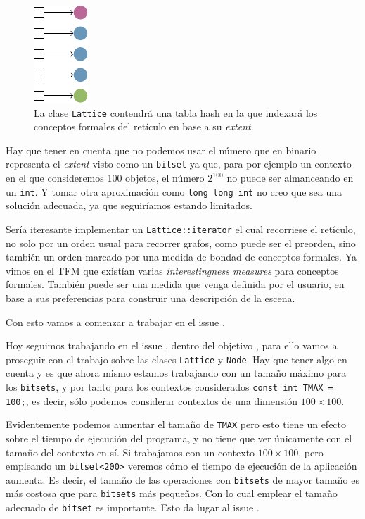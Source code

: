 \documentclass[
hue = 206,
sdrawing = 0.44,
bdrawing = 0.73,
stext = 0.45,
btext = 0.44,
sline = 0.46,
bline = 0.15]{grigerart}
\begin{document}
\begin{figure}[ht]
  \centering
  \includegraphics[]{figures/hash.pdf}
  \caption{\label{fig:hash} La clase \texttt{Lattice} contendrá una tabla hash en la que indexará los conceptos formales del retículo en base a su \textit{extent}.}
\end{figure}

\begin{notice}
  Hay que tener en cuenta que no podemos usar el número que en binario representa el \textit{extent} visto como un \texttt{bitset} ya que, para por ejemplo un contexto en el que consideremos 100 objetos, el número $2^{100}$ no puede ser almanceando en un \texttt{int}. Y tomar otra aproximación como \texttt{long long int} no creo que sea una solución adecuada, ya que seguiríamos estando limitados.
\end{notice}

\begin{idea}
  Sería iteresante implementar un \texttt{Lattice::iterator} el cual recorriese el retículo, no solo por un orden usual para recorrer grafos, como puede ser el preorden, sino también un orden marcado por una medida de bondad de conceptos formales. Ya vimos en el TFM que existían varias \textit{interestingness measures} para conceptos formales. También puede ser una medida que venga definida por el usuario, en base a sus preferencias para construir una descripción de la escena.
\end{idea}
Con esto vamos a comenzar a trabajar en el issue .


Hoy seguimos trabajando en el issue , dentro del objetivo , para ello vamos a proseguir con el trabajo sobre las clases \texttt{Lattice} y \texttt{Node}. Hay que tener algo en cuenta y es que ahora mismo estamos trabajando con un tamaño máximo para los \texttt{bitsets}, y por tanto para los contextos considerados \texttt{const int TMAX = 100;}, es decir, sólo podemos considerar contextos de una dimensión $100 \times 100$.

\begin{notice}
  Evidentemente podemos aumentar el tamaño de \texttt{TMAX} pero esto tiene un efecto sobre el tiempo de ejecución del programa, y no tiene que ver únicamente con el tamaño del contexto en sí. Si trabajamos con un contexto $100 \times 100$, pero empleando un \texttt{bitset<200>} veremos cómo el tiempo de ejecución de la aplicación aumenta. Es decir, el tamaño de las operaciones con \texttt{bitsets} de mayor tamaño es más costosa que para \texttt{bitsets} más pequeños. Con lo cual emplear el tamaño adecuado de \texttt{bitset} es importante. Esto da lugar al issue .
\end{notice}
\end{document}
